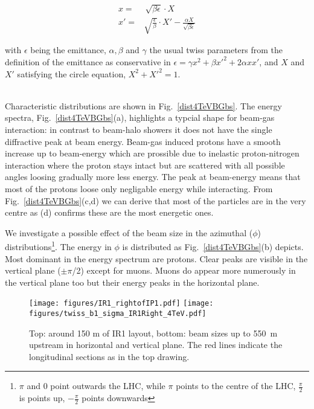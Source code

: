 \begin{equation} \label{eq1}
  \begin{split}
x = & \, \sqrt{\beta \epsilon} \cdot X \\
x' = & \sqrt{\frac{\epsilon}{\beta}} \cdot X' - \frac{\alpha X}{\sqrt{\beta \epsilon}}
  \end{split}
\end{equation}

with $\epsilon$ being the emittance, $\alpha, \beta$ and $\gamma$ the usual twiss parameters from the definition of the emittance as conservative in $\epsilon = \gamma x^2 + \beta x'^2 + 2 \alpha x x'$, and $X$ and $X'$ satisfying the circle equation, $X^2 + X'^2 = 1$. 

{\\}
Characteristic distributions are shown in Fig.~\ref{dist4TeVBGbs}. The energy spectra, Fig.~\ref{dist4TeVBGbs}(a), highlights a typcial shape for beam-gas interaction: in contrast to beam-halo showers it does not have the single diffractive peak at beam energy. Beam-gas induced protons have a smooth increase up to beam-energy which are prossible due to inelastic proton-nitrogen interaction where the proton stays intact but are scattered with all possible angles loosing gradually more less energy. The peak at beam-energy means that most of the protons loose only negligable energy while interacting. From Fig.~\ref{dist4TeVBGbs}(c,d) we can derive that most of the particles are in the very centre as (d) confirms these are the most energetic ones. 

We investigate a possible effect of the beam size in the azimuthal ($\phi$) distributions\footnote{$\pi$ and $0$ point outwards the LHC, while $\pi$ points to the centre of the LHC, $\frac{\pi}{2}$ is points up, $-\frac{\pi}{2}$ points downwards}. The energy in $\phi$ is distributed as Fig.~\ref{dist4TeVBGbs}(b) depicts. Most dominant in the energy spectrum are protons. Clear peaks are visible in the vertical plane ($\pm\pi$/2) except for muons. Muons do appear more numerously in the vertical plane too but their energy peaks in the horizontal plane.

\begin{figure}[!htb]
\begin{center}
  \texttt{[image: figures/IR1\_rightofIP1.pdf]}
  \texttt{[image: figures/twiss\_b1\_sigma\_IR1Right\_4TeV.pdf]}
\end{center}
\vspace{-0.6cm}
 \caption{Top: around 150 m of IR1 layout, bottom: beam sizes up to 550~m upstream in horizontal and vertical plane. The red lines indicate the longitudinal sections as in the top drawing. 
  \label{twissfileBS}}
\end{figure}

